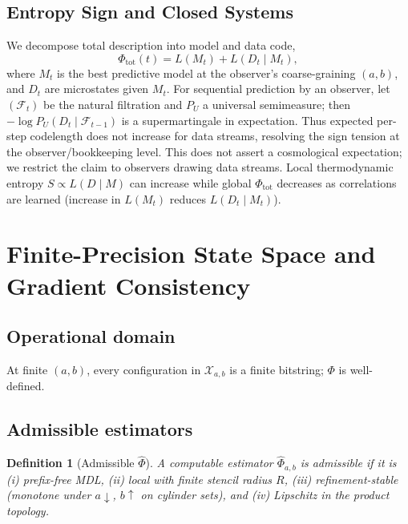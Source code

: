 \documentclass[aps,preprint,onecolumn,longbibliography,nofootinbib]{revtex4-2}
\numberwithin{equation}{section}        %
\newtheorem{definition}{Definition}
\begin{document}
\subsection{Entropy Sign and Closed Systems}\label{sec:closed}
We decompose total description into model and data code,
\begin{equation}
\Phi_{\text{tot}}(t) = L(M_t) + L(D_t \mid M_t),\label{eq:mdl-split}
\end{equation}
where $M_t$ is the best predictive model at the observer's coarse-graining $(a,b)$, and $D_t$ are microstates given $M_t$. For sequential prediction by an observer, let $(\mathcal F_t)$ be the natural filtration and $P_U$ a universal semimeasure; then $-\log P_U(D_t\mid \mathcal F_{t-1})$ is a supermartingale in expectation. Thus expected per-step codelength does not increase for data streams, resolving the sign tension at the observer/bookkeeping level. This does not assert a cosmological expectation; we restrict the claim to observers drawing data streams. Local thermodynamic entropy $S\propto L(D\mid M)$ can increase while global $\Phi_{\text{tot}}$ decreases as correlations are learned (increase in $L(M_t)$ reduces $L(D_t\mid M_t)$).

\section{Finite-Precision State Space and Gradient Consistency}
\subsection{Operational domain}
At finite $(a,b)$, every configuration in $\mathcal X_{a,b}$ is a finite bitstring; $\Phi$ is well-defined.

\subsection{Admissible estimators}
\begin{definition}[Admissible $\widehat\Phi$]
A computable estimator $\widehat\Phi_{a,b}$ is admissible if it is (i) prefix-free MDL, (ii) local with finite stencil radius $R$, (iii) refinement-stable (monotone under $a\downarrow$, $b\uparrow$ on cylinder sets), and (iv) Lipschitz in the product topology.
\end{definition}
\end{document}
